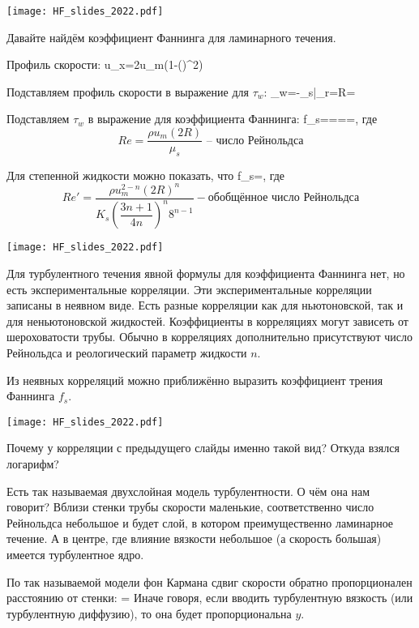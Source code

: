 \documentclass[main.tex]{subfiles}
\begin{document}
\texttt{[image: HF\_slides\_2022.pdf]}

Давайте найдём коэффициент Фаннинга для ламинарного течения.

Профиль скорости:
\beq
u_x=2u_m\left(1-\left(\right)^2\right)
\eeq

Подставляем профиль скорости в выражение для $\tau_w$:
\beq
\tau_w=-\mu_s\bigg|_{r=R}=
\eeq

Подставляем $\tau_w$ в выражение для коэффициента Фаннинга:
\beq
f_s====,
\eeq
где
$$Re=\frac{\rho u_m(2R)}{\mu_s}\text{ -- число Рейнольдса}$$

Для степенной жидкости можно показать, что
\beq
f_s=,
\eeq
где
$$Re'=\dfrac{\rho u_m^{2-n}(2R)^n}{K_s\left(\dfrac{3n+1}{4n}\right)^n8^{n-1}}-\text{обобщённое число Рейнольдса}$$

\texttt{[image: HF\_slides\_2022.pdf]}

Для турбулентного течения явной формулы для коэффициента Фаннинга нет, но есть экспериментальные корреляции.
Эти экспериментальные корреляции записаны в неявном виде.
Есть разные корреляции как для ньютоновской, так и для неньютоновской жидкостей.
Коэффициенты в корреляциях могут зависеть от шероховатости трубы.
Обычно в корреляциях дополнительно присутствуют число Рейнольдса и реологический параметр жидкости $n$.

Из неявных корреляций можно приближённо выразить коэффициент трения Фаннинга $f_s$.

\texttt{[image: HF\_slides\_2022.pdf]}

Почему у корреляции с предыдущего слайды именно такой вид?
Откуда взялся логарифм?

Есть так называемая двухслойная модель турбулентности.
О чём она нам говорит?
Вблизи стенки трубы скорости маленькие, соответственно число Рейнольдса небольшое и будет слой, в котором преимущественно ламинарное течение.
А в центре, где влияние вязкости небольшое (а скорость большая) имеется турбулентное ядро.

По так называемой модели фон Кармана сдвиг скорости обратно пропорционален расстоянию от стенки:
\beq
{}=
\eeq
Иначе говоря, если вводить турбулентную вязкость (или турбулентную диффузию), то она будет пропорциональна $y$.
\end{document}
